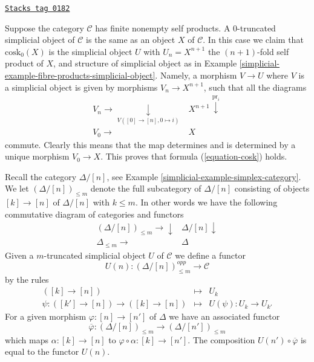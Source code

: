 \begin{example}[Cosk0]
\label{simplicial-example-cosk0}
\href{https://stacks.math.columbia.edu/tag/0182}{\texttt{Stacks tag 0182}}

Suppose the category $\mathcal{C}$ has finite nonempty self products.
A $0$-truncated simplicial object of $\mathcal{C}$ is the same
as an object $X$ of $\mathcal{C}$. In this case
we claim that $\text{cosk}_0(X)$ is the simplicial
object $U$ with $U_n = X^{n + 1}$ the $(n + 1)$-fold self
product of $X$, and structure of simplicial object
as in Example \ref{simplicial-example-fibre-products-simplicial-object}.
Namely, a morphism $V \to U$ where $V$ is a simplicial
object is given by morphisms $V_n \to X^{n + 1}$, such
that all the diagrams
$$
\begin{array}{cc}V_n \longrightarrow\underset{V([0] \to [n], 0 \mapsto i)}{\downarrow} & X^{n + 1} \overset{\text{pr}_i}{\downarrow} \\ V_0 \longrightarrow & X\end{array}
$$
commute. Clearly this means that the map determines and is determined
by a unique morphism $V_0 \to X$. This proves that formula
(\ref{equation-cosk}) holds.
\end{example}

Recall the category $\Delta/[n]$, see Example \ref{simplicial-example-simplex-category}.
We let $(\Delta/[n])_{\leq m}$ denote the full subcategory
of $\Delta/[n]$ consisting of objects $[k] \to [n]$
of $\Delta/[n]$ with $k \leq m$. In other words we have
the following commutative diagram of categories and functors
$$
\begin{array}{cc}(\Delta/[n])_{\leq m} \longrightarrow\downarrow & \Delta/[n] \downarrow \\ \Delta_{\leq m} \longrightarrow & \Delta\end{array}
$$
Given a $m$-truncated
simplicial object $U$ of $\mathcal{C}$
we define a functor
$$
U(n) : (\Delta/[n])_{\leq m}^{opp} \longrightarrow \mathcal{C}
$$
by the rules
\begin{eqnarray*}
([k] \to [n]) & \longmapsto & U_k \\
\psi : ([k'] \to [n]) \to ([k] \to [n]) &
\longmapsto &
U(\psi) : U_k \to U_{k'}
\end{eqnarray*}
For a given morphism $\varphi : [n] \to [n']$ of $\Delta$
we have an associated functor
$$
\overline{\varphi} :
(\Delta/[n])_{\leq m}
\longrightarrow
(\Delta/[n'])_{\leq m}
$$
which maps $\alpha : [k] \to [n]$ to
$\varphi \circ \alpha : [k] \to [n']$.
The composition $U(n') \circ \overline{\varphi}$ is
equal to the functor $U(n)$.

